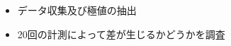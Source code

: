     \begin{itemize}
        \item データ収集及び極値の抽出
        \item 20回の計測によって差が生じるかどうかを調査
    \end{itemize}






